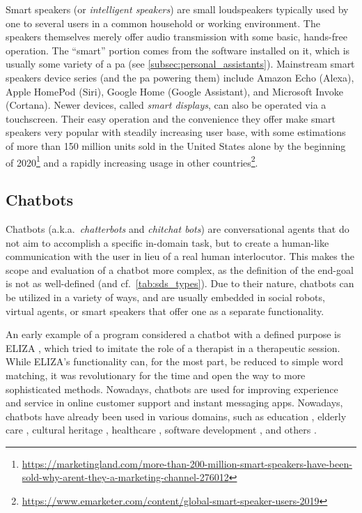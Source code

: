 Smart speakers (or \emph{intelligent speakers}) are small loudspeakers typically used by one to several users in a common household or working environment.
The speakers themselves merely offer audio transmission with some basic, hands-free operation.
The \enquote{smart} portion comes from the software installed on it, which is usually some variety of a \ac{pa} (see \cref{subsec:personal_assistants}).
Mainstream smart speakers device series (and the \ac{pa} powering them) include Amazon Echo (Alexa), Apple HomePod (Siri), Google Home (Google Assistant), and Microsoft Invoke (Cortana).
Newer devices, called \emph{smart displays}, can also be operated via a touchscreen.
Their easy operation and the convenience they offer make smart speakers very popular with steadily increasing user base, with some estimations of more than 150 million units sold in the United States alone by the beginning of 2020\footnote{\url{https://marketingland.com/more-than-200-million-smart-speakers-have-been-sold-why-arent-they-a-marketing-channel-276012}} and a rapidly increasing usage in other countries\footnote{\url{https://www.emarketer.com/content/global-smart-speaker-users-2019}}.

\subsection{Chatbots}
\label{subsec:chatbots}

Chatbots (a.k.a.\ \emph{chatterbots} and \emph{chitchat bots}) are conversational agents that do not aim to accomplish a specific in-domain task, but to create a human-like communication with the user in lieu of a real human interlocutor.
This makes the scope and evaluation of a chatbot more complex, as the definition of the end-goal is not as well-defined (and cf.\ \cref{tab:sds_types}).
Due to their nature, chatbots can be utilized in a variety of ways, and are usually embedded in social robots, virtual agents, or smart speakers that offer one as a separate functionality.

An early example of a program considered a chatbot with a defined purpose is ELIZA \citep{Weizenbaum1966eliza}, which tried to imitate the role of a therapist in a therapeutic session.
While ELIZA's functionality can, for the most part, be reduced to simple word matching, it was revolutionary for the time and open the way to more sophisticated methods.
Nowadays, chatbots are used for improving experience and service in online customer support and instant messaging apps.
Nowadays, chatbots have already been used in various domains, such as education \citep{Benotti2014engaging, Kerly2007bringing}, elderly care \citep{Iio2020twin}, cultural heritage \citep{Pilato2005expert}, healthcare \citep{Kowatsch2017text}, software development \citep{Lebeuf2017software}, and others \citep{Shawar2007chatbots}.

